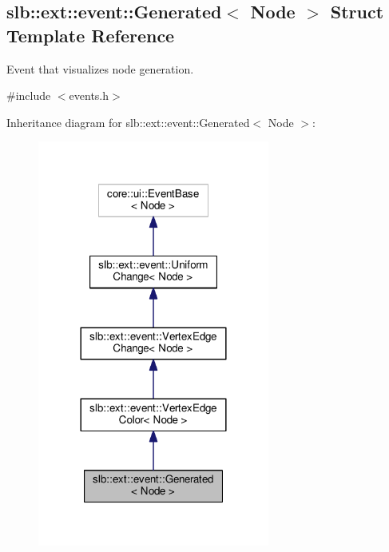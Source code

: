 \hypertarget{structslb_1_1ext_1_1event_1_1Generated}{}\subsection{slb\+:\+:ext\+:\+:event\+:\+:Generated$<$ Node $>$ Struct Template Reference}
\label{structslb_1_1ext_1_1event_1_1Generated}


Event that visualizes node generation.  




{\ttfamily \#include $<$events.\+h$>$}



Inheritance diagram for slb\+:\+:ext\+:\+:event\+:\+:Generated$<$ Node $>$\+:\nopagebreak
\begin{figure}[H]
\begin{center}
\leavevmode
\includegraphics[width=216pt]{structslb_1_1ext_1_1event_1_1Generated__inherit__graph}
\end{center}
\end{figure}


